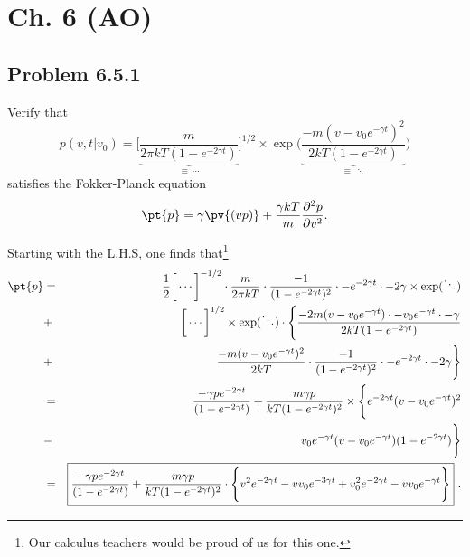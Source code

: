 \section{Ch. 6 (AO)}
\subsection{Problem 6.5.1}

Verify that
\begin{equation}
p(v, t|v_0) = \bigg[\underbrace{\frac{m}{2\pi k T (1-e^{-2\gamma t})}}_{\equiv~\cdots}\bigg]^{1/2} \times \exp\bigg(\underbrace{\frac{-m(v-v_0 e^{-\gamma t})^2}{2 k T (1-e^{-2\gamma t})}}_{\equiv~ \ddots}\bigg)
\end{equation}
satisfies the Fokker-Planck equation
\begin{equation}
\pt{p} = \gamma \pv{(vp)} + \frac{\gamma k T}{m} \frac{\partial^2 p}{\partial v^2}.
\end{equation}

Starting with the L.H.S, one finds that\footnote{Our calculus teachers would be proud of us for this one.}
\begin{eqnarray}
\pt{p} &=& \frac{1}{2} \bigg[\cdots\bigg]^{-1/2} \cdot \frac{m}{2\pi k T} \cdot \frac{-1}{(1-e^{-2\gamma t})^2} \cdot -e^{-2\gamma t} \cdot -2\gamma \times \exp(\ddots) \nonumber \\
&+& \bigg[\cdots\bigg]^{1/2} \times \exp(\ddots) \cdot \Bigg\{ \frac{-2 m (v-v_0 e^{-\gamma t}) \cdot -v_0 e^{-\gamma t} \cdot -\gamma }{2 k T (1-e^{-2\gamma t})} \nonumber \\
&+& \frac{-m(v-v_0 e^{-\gamma t})^2}{2 k T} \cdot \frac{-1}{(1-e^{-2\gamma t})^2} \cdot -e^{-2\gamma t} \cdot -2 \gamma  \Bigg\} \nonumber \\
&=& \frac{-\gamma p e^{-2 \gamma t}}{(1-e^{-2 \gamma t})} 
+ \frac{m \gamma p}{kT(1-e^{-2\gamma t})^2} \times \Bigg\{ e^{-2 \gamma t} (v-v_0 e^{-\gamma t})^2 \nonumber \\
&-& v_0 e^{-\gamma t} (v-v_0 e^{-\gamma t}) (1-e^{-2 \gamma t})\Bigg\} \nonumber \\
&=& \boxed{ \frac{-\gamma p e^{-2 \gamma t}}{(1-e^{-2 \gamma t})} 
+ \frac{m \gamma p}{kT(1-e^{-2\gamma t})^2} \cdot  \Bigg\{  v^2 e^{-2\gamma t} - v v_0  e^{-3\gamma t} + v_0 ^2 e^{-2\gamma t} - v v_0 e^{-\gamma t} \Bigg\} }~. \nonumber
\end{eqnarray}

